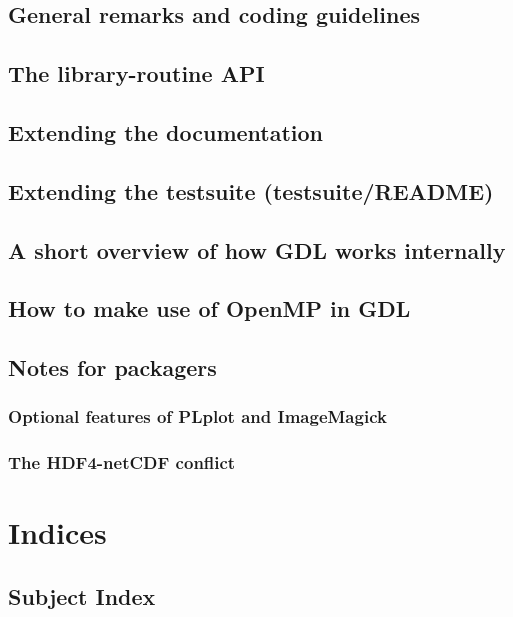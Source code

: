 \documentclass[10pt,titleauthor,openany]{mwbk}
\begin{document}
  \chapter{General remarks and coding guidelines}
  
 
  \chapter{The library-routine API}
  

  \chapter{Extending the documentation}
  
  \chapter{Extending the testsuite (testsuite/README)}
  
  \chapter{A short overview of how GDL works internally}
  

  \chapter{How to make use of OpenMP in GDL}
 
  \chapter{Notes for packagers}
  \section{Optional features of PLplot and ImageMagick}
  \section{The HDF4-netCDF conflict}

  \part{Indices}
  \onecolumn
  \appendix
  \secondarysize
  \chapter*{Subject Index}
  \begin{multicols}{3}{\printindex}
  \end{multicols}

  \twocolumn
  
\end{document}
